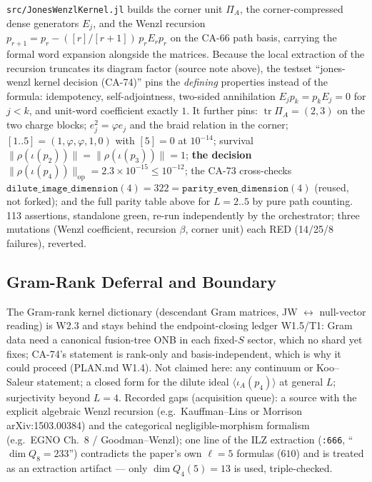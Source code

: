 \texttt{src/JonesWenzlKernel.jl} builds the corner unit \(\Pi_A\), the
corner-compressed dense generators \(E_j\), and the Wenzl recursion
\(p_{r+1}=p_r-([r]/[r+1])\,p_rE_rp_r\) on the CA-66 path basis, carrying
the formal word expansion alongside the matrices.  Because the local
extraction of the recursion truncates its diagram factor (source note
above), the testset ``jones-wenzl kernel decision (CA-74)'' pins the
\emph{defining} properties instead of the formula: idempotency,
self-adjointness, two-sided annihilation \(E_jp_k=p_kE_j=0\) for \(j<k\),
and unit-word coefficient exactly \(1\).  It further pins:
\(\operatorname{tr}\Pi_A=(2,3)\) on the two charge blocks; \(e_j^2=\varphi
e_j\) and the braid relation in the corner; \([1..5]=(1,\varphi,\varphi,1,0)\)
with \([5]=0\) at \(10^{-14}\); survival
\(\|\rho(\iota(p_2))\|=\|\rho(\iota(p_3))\|=1\); \textbf{the decision}
\(\|\rho(\iota(p_4))\|_{\mathrm{op}}=2.3\times10^{-15}\le10^{-12}\); the
CA-73 cross-checks \(\texttt{dilute\_image\_dimension}(4)=322=
\texttt{parity\_even\_dimension}(4)\) (reused, not forked); and the full
parity table above for \(L=2..5\) by pure path counting.  113 assertions,
standalone green, re-run independently by the orchestrator; three
mutations (Wenzl coefficient, recursion \(\beta\), corner unit) each RED
(14/25/8 failures), reverted.

\subsection{Gram-Rank Deferral and Boundary}

The Gram-rank kernel dictionary (descendant Gram matrices, JW \(\leftrightarrow\)
null-vector reading) is W2.3 and stays behind the endpoint-closing ledger
W1.5/T1: Gram data need a canonical fusion-tree ONB in each fixed-\(S\)
sector, which no shard yet fixes; CA-74's statement is rank-only and
basis-independent, which is why it could proceed (PLAN.md W1.4).  Not
claimed here: any continuum or Koo--Saleur statement; a closed form for the
dilute ideal \(\langle\iota_A(p_4)\rangle\) at general \(L\); surjectivity
beyond \(L=4\).  Recorded gaps (acquisition queue): a source with the
explicit algebraic Wenzl recursion (e.g.\ Kauffman--Lins or Morrison
arXiv:1503.00384) and the categorical negligible-morphism formalism (e.g.\
EGNO Ch.\ 8 / Goodman--Wenzl); one line of the ILZ extraction
(\texttt{:666}, ``\(\dim Q_8=233\)'') contradicts the paper's own
\(\ell=5\) formulas (\(610\)) and is treated as an extraction artifact —
only \(\dim Q_4(5)=13\) is used, triple-checked.
